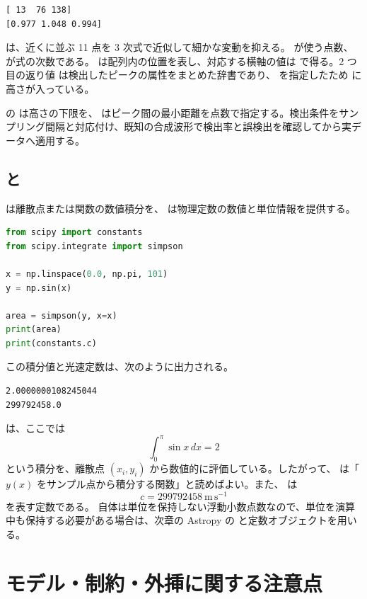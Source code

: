 \begin{lstlisting}[numbers=none, xleftmargin=2\zw]
[ 13  76 138]
[0.977 1.048 0.994]
\end{lstlisting}

 は、近くに並ぶ 11 点を 3 次式で近似して細かな変動を抑える。 が使う点数、 が式の次数である。 は配列内の位置を表し、対応する横軸の値は  で得る。2 つ目の返り値  は検出したピークの属性をまとめた辞書であり、 を指定したため  に高さが入っている。

 の  は高さの下限を、 はピーク間の最小距離を点数で指定する。検出条件をサンプリング間隔と対応付け、既知の合成波形で検出率と誤検出を確認してから実データへ適用する。

\subsection{ と }

 は離散点または関数の数値積分を、 は物理定数の数値と単位情報を提供する。

\begin{lstlisting}[language=Python]
from scipy import constants
from scipy.integrate import simpson

x = np.linspace(0.0, np.pi, 101)
y = np.sin(x)

area = simpson(y, x=x)
print(area)
print(constants.c)
\end{lstlisting}

この積分値と光速定数は、次のように出力される。

\begin{lstlisting}[numbers=none, xleftmargin=2\zw]
2.0000000108245044
299792458.0
\end{lstlisting}

 は、ここでは
\[
\int_0^\pi \sin x\,dx = 2
\]
という積分を、離散点 \((x_i, y_i)\) から数値的に評価している。したがって、 は「\(y(x)\) をサンプル点から積分する関数」と読めばよい。また、 は
\[
c = 299792458\ \mathrm{m\,s^{-1}}
\]
を表す定数である。 自体は単位を保持しない浮動小数点数なので、単位を演算中も保持する必要がある場合は、次章の Astropy の  と定数オブジェクトを用いる。

\section{モデル・制約・外挿に関する注意点}


